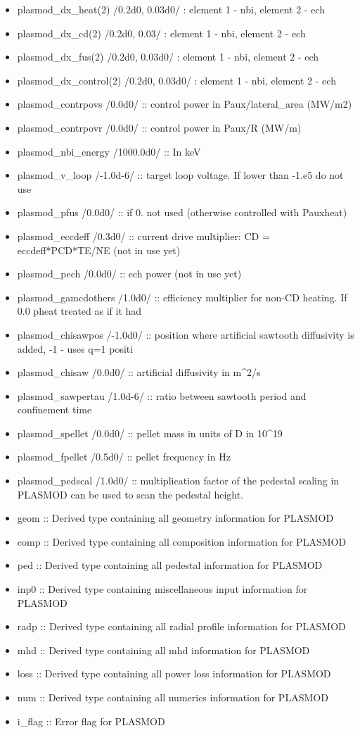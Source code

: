 \documentclass[]{article}
\begin{document}
\begin{itemize}
\item
  plasmod\_dx\_heat(2) /0.2d0, 0.03d0/ : element 1 - nbi, element 2 -
  ech
\item
  plasmod\_dx\_cd(2) /0.2d0, 0.03/ : element 1 - nbi, element 2 - ech
\item
  plasmod\_dx\_fus(2) /0.2d0, 0.03d0/ : element 1 - nbi, element 2 - ech
\item
  plasmod\_dx\_control(2) /0.2d0, 0.03d0/ : element 1 - nbi, element 2 -
  ech
\item
  plasmod\_contrpovs /0.0d0/ :: control power in Paux/lateral\_area
  (MW/m2)
\item
  plasmod\_contrpovr /0.0d0/ :: control power in Paux/R (MW/m)
\item
  plasmod\_nbi\_energy /1000.0d0/ :: In keV
\item
  plasmod\_v\_loop /-1.0d-6/ :: target loop voltage. If lower than -1.e5
  do not use
\item
  plasmod\_pfus /0.0d0/ :: if 0. not used (otherwise controlled with
  Pauxheat)
\item
  plasmod\_eccdeff /0.3d0/ :: current drive multiplier: CD =
  eccdeff*PCD*TE/NE (not in use yet)
\item
  plasmod\_pech /0.0d0/ :: ech power (not in use yet)
\item
  plasmod\_gamcdothers /1.0d0/ :: efficiency multiplier for non-CD
  heating. If 0.0 pheat treated as if it had
\item
  plasmod\_chisawpos /-1.0d0/ :: position where artificial sawtooth
  diffusivity is added, -1 - uses q=1 positi
\item
  plasmod\_chisaw /0.0d0/ :: artificial diffusivity in m\^{}2/s
\item
  plasmod\_sawpertau /1.0d-6/ :: ratio between sawtooth period and
  confinement time
\item
  plasmod\_spellet /0.0d0/ :: pellet mass in units of D in 10\^{}19
\item
  plasmod\_fpellet /0.5d0/ :: pellet frequency in Hz
\item
  plasmod\_pedscal /1.0d0/ :: multiplication factor of the pedestal
  scaling in PLASMOD can be used to scan the pedestal height.
\item
  geom :: Derived type containing all geometry information for PLASMOD
\item
  comp :: Derived type containing all composition information for
  PLASMOD
\item
  ped :: Derived type containing all pedestal information for PLASMOD
\item
  inp0 :: Derived type containing miscellaneous input information for
  PLASMOD
\item
  radp :: Derived type containing all radial profile information for
  PLASMOD
\item
  mhd :: Derived type containing all mhd information for PLASMOD
\item
  loss :: Derived type containing all power loss information for PLASMOD
\item
  num :: Derived type containing all numerics information for PLASMOD
\item
  i\_flag :: Error flag for PLASMOD
\end{itemize}
\end{document}
